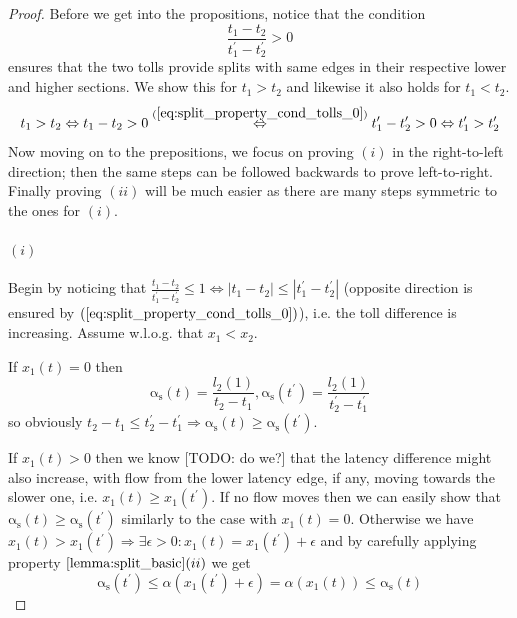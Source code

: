 \documentclass[10pt,a4paper]{book}
\newcommand{\LeftrightarrowArg}[1]{\stackrel{#1}{\Leftrightarrow}}
\newcommand{\as}{\mathrm{\alpha_s}}
\theoremstyle{definition}
\theoremstyle{comment}
\begin{document}
\begin{proof}
	Before we get into the propositions, notice that the condition
	\begin{equation}
		\frac{t_1 - t_2}{t_1^\prime - t_2^\prime} > 0
		\label{eq:split_property_cond_tolls_0}
	\end{equation}
	ensures that the two tolls provide splits with same edges in their respective lower and higher sections.
	We show this for $t_1 > t_2$ and likewise it also holds for $t_1 < t_2$.
	\[t_1 > t_2 \Leftrightarrow t_1 - t_2 > 0 \LeftrightarrowArg{(\ref{eq:split_property_cond_tolls_0})} t_1^\prime - t_2^\prime > 0 \Leftrightarrow t_1^\prime > t_2^\prime\]
	Now moving on to the prepositions, we focus on proving $(i)$ in the right-to-left direction; then the same steps can be followed backwards to prove left-to-right.
	Finally proving $(ii)$ will be much easier as there are many steps symmetric to the ones for $(i)$.
	
	\paragraph{$(i)$}
	Begin by noticing that $\frac{t_1 - t_2}{t_1^\prime - t_2^\prime} \le 1 \Leftrightarrow |t_1 - t_2| \le |t_1^\prime - t_2^\prime|$ (opposite direction is ensured by $(\ref{eq:split_property_cond_tolls_0})$), i.e. the toll difference is increasing.
	Assume w.l.o.g. that $x_1 < x_2$.
	
	If $x_1(t) = 0$ then
	\[\as(t) = \frac{l_2(1)}{t_2 - t_1}, \as(t^\prime) = \frac{l_2(1)}{t_2^\prime - t_1^\prime}\] 
	so obviously $t_2 - t_1 \le t_2^\prime - t_1^\prime \Rightarrow \as(t) \ge \as(t^\prime)$.
	
	If $x_1(t) > 0$ then we know [TODO: do we?] that the latency difference might also increase, with flow from the lower latency edge, if any, moving towards the slower one, i.e. $x_1(t) \ge x_1(t^\prime)$.
	If no flow moves then we can easily show that $\as(t) \ge \as(t^\prime)$ similarly to the case with $x_1(t) = 0$.
	Otherwise we have $x_1(t) > x_1(t^\prime) \Rightarrow \exists \epsilon > 0: x_1(t) = x_1(t^\prime) + \epsilon$ and by carefully applying property $\ref{lemma:split_basic}(ii)$ we get
	\[\as(t^\prime) \le \alpha(x_1(t^\prime) + \epsilon) = \alpha(x_1(t)) \le \as(t)\]
	

\end{proof}
\end{document}
